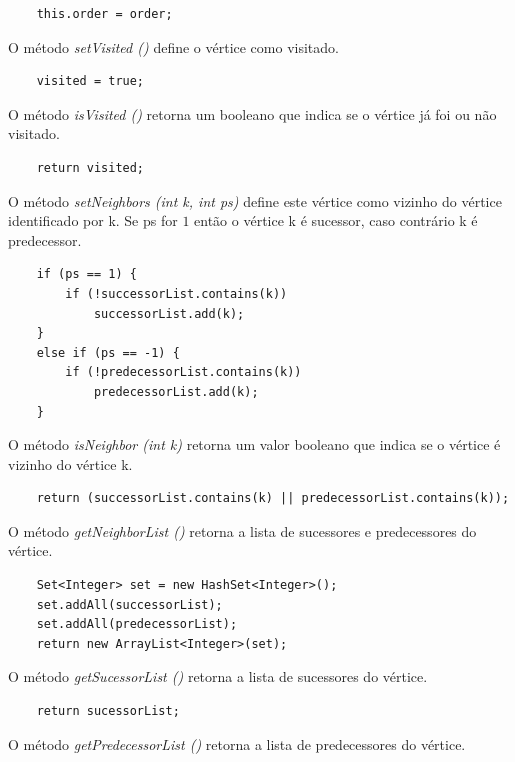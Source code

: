 \documentclass[a4paper,10pt]{report}
\begin{document}
\begin{lstlisting}
    this.order = order;
\end{lstlisting}

O método \textit{setVisited ()} define o vértice como visitado.

\begin{lstlisting}
    visited = true;
\end{lstlisting}

O método \textit{isVisited ()} retorna um booleano que indica se o vértice já foi ou não visitado.

\begin{lstlisting}
    return visited;
\end{lstlisting}

O método \textit{setNeighbors (int k, int ps)} define este vértice como vizinho do vértice identificado por k. Se ps for $1$ então o vértice k é sucessor, caso contrário k é predecessor.

\begin{lstlisting}
    if (ps == 1) {
        if (!successorList.contains(k))
            successorList.add(k);
    }
    else if (ps == -1) {
        if (!predecessorList.contains(k))
            predecessorList.add(k);
    }
\end{lstlisting}

O método \textit{isNeighbor (int k)} retorna um valor booleano que indica se o vértice é vizinho do vértice k.

\begin{lstlisting}
    return (successorList.contains(k) || predecessorList.contains(k));
\end{lstlisting}

O método \textit{getNeighborList ()} retorna a lista de sucessores e predecessores do vértice.

\begin{lstlisting}
    Set<Integer> set = new HashSet<Integer>();
    set.addAll(successorList);
    set.addAll(predecessorList);
    return new ArrayList<Integer>(set);
\end{lstlisting}

O método \textit{getSucessorList ()} retorna a lista de sucessores do vértice.

\begin{lstlisting}
    return sucessorList;
\end{lstlisting}

O método \textit{getPredecessorList ()} retorna a lista de predecessores do vértice.
\end{document}

